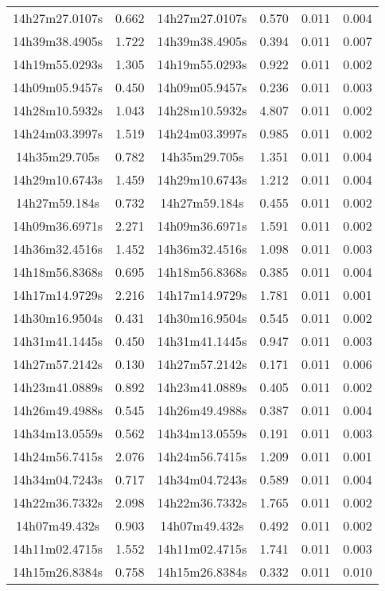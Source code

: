 \begin{table}
\begin{tabular}{cccccc}
14h27m27.0107s & 0.662 & 14h27m27.0107s & 0.570 & 0.011 & 0.004 \\
14h39m38.4905s & 1.722 & 14h39m38.4905s & 0.394 & 0.011 & 0.007 \\
14h19m55.0293s & 1.305 & 14h19m55.0293s & 0.922 & 0.011 & 0.002 \\
14h09m05.9457s & 0.450 & 14h09m05.9457s & 0.236 & 0.011 & 0.003 \\
14h28m10.5932s & 1.043 & 14h28m10.5932s & 4.807 & 0.011 & 0.002 \\
14h24m03.3997s & 1.519 & 14h24m03.3997s & 0.985 & 0.011 & 0.002 \\
14h35m29.705s & 0.782 & 14h35m29.705s & 1.351 & 0.011 & 0.004 \\
14h29m10.6743s & 1.459 & 14h29m10.6743s & 1.212 & 0.011 & 0.004 \\
14h27m59.184s & 0.732 & 14h27m59.184s & 0.455 & 0.011 & 0.002 \\
14h09m36.6971s & 2.271 & 14h09m36.6971s & 1.591 & 0.011 & 0.002 \\
14h36m32.4516s & 1.452 & 14h36m32.4516s & 1.098 & 0.011 & 0.003 \\
14h18m56.8368s & 0.695 & 14h18m56.8368s & 0.385 & 0.011 & 0.004 \\
14h17m14.9729s & 2.216 & 14h17m14.9729s & 1.781 & 0.011 & 0.001 \\
14h30m16.9504s & 0.431 & 14h30m16.9504s & 0.545 & 0.011 & 0.002 \\
14h31m41.1445s & 0.450 & 14h31m41.1445s & 0.947 & 0.011 & 0.003 \\
14h27m57.2142s & 0.130 & 14h27m57.2142s & 0.171 & 0.011 & 0.006 \\
14h23m41.0889s & 0.892 & 14h23m41.0889s & 0.405 & 0.011 & 0.002 \\
14h26m49.4988s & 0.545 & 14h26m49.4988s & 0.387 & 0.011 & 0.004 \\
14h34m13.0559s & 0.562 & 14h34m13.0559s & 0.191 & 0.011 & 0.003 \\
14h24m56.7415s & 2.076 & 14h24m56.7415s & 1.209 & 0.011 & 0.001 \\
14h34m04.7243s & 0.717 & 14h34m04.7243s & 0.589 & 0.011 & 0.004 \\
14h22m36.7332s & 2.098 & 14h22m36.7332s & 1.765 & 0.011 & 0.002 \\
14h07m49.432s & 0.903 & 14h07m49.432s & 0.492 & 0.011 & 0.002 \\
14h11m02.4715s & 1.552 & 14h11m02.4715s & 1.741 & 0.011 & 0.003 \\
14h15m26.8384s & 0.758 & 14h15m26.8384s & 0.332 & 0.011 & 0.010 \\

\end{tabular}
\end{table}
